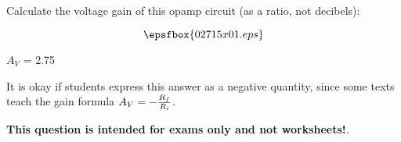 

Calculate the voltage gain of this opamp circuit (as a ratio, not decibels):

$$\epsfbox{02715x01.eps}$$







$A_V$ = 2.75

\vskip 10pt

It is okay if students express this answer as a negative quantity, since some texts teach the gain formula $A_V = -{R_f \over R_i}$.







{\bf This question is intended for exams only and not worksheets!}.




